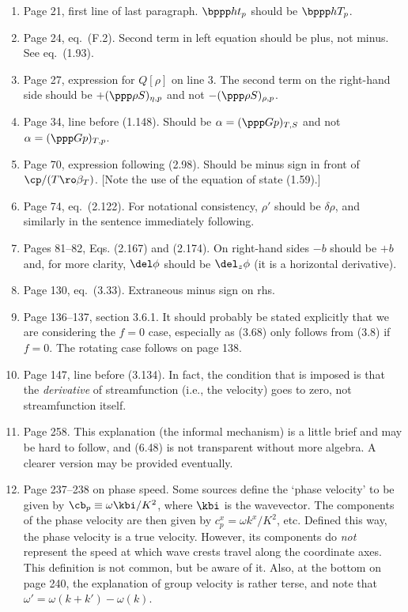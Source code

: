 \documentclass[10pt]{article}
\newcommand{\eq}{eq.\ } \newcommand{\Eq}{Eq.\ }
\begin{document}
\begin{enumerate}

\item Page 21, first line of last paragraph. $\bppp h t _p$ should be $\bppp hT_p$.

\item Page 24, \eq (F.2). Second term in left equation should be plus, not minus. See \eq (1.93).

\item Page 27, expression for $Q[\rho]$ on line 3. The second term on the right-hand side should be $+ (\ppp \rho S)_{\eta,p}$ and not $-(\ppp \rho S)_{\rho,p}$.

\item Page 34, line before (1.148). Should be $\alpha  = (\ppp G p)_{T,S}$ and not
$\alpha  = (\ppp G p)_{T,p}$.

\item Page 70, expression following (2.98). Should be minus sign in front of $\cp/(T 
\ro\beta_T)$. [Note the use of the equation of state (1.59).] 

\item Page 74, \eq (2.122). For notational consistency, $\rho'$ should be $\delta \rho$, and similarly in the sentence immediately following. 

\item Pages 81--82, Eqs. (2.167) and (2.174). On right-hand sides $-b$ should be $+b$ and, for more clarity, $\del \phi$ should be $\del_z\phi$ (it is a horizontal derivative).

\item Page 130, \eq (3.33). Extraneous minus sign on rhs.

\item Page 136--137, section 3.6.1. It should probably be stated explicitly that we are considering the $f=0$ case, especially as (3.68) only follows from (3.8) if $f=0$. The rotating case follows on page 138. 

\item Page 147, line before (3.134). In fact, the condition that is imposed is that the \emph{derivative} of streamfunction (i.e., the velocity) goes to zero, not streamfunction itself. 

\item \label{informal} Page 258. This explanation (the informal mechanism) is a little brief and may be hard to follow, and (6.48) is not transparent without more algebra. A clearer version may be provided eventually. 

\item Page 237--238 on phase speed. Some sources define the `phase velocity' to be given by $\cb_p \equiv \omega \kbi / K^2$, where $\kbi$ is the wavevector. The components of the phase velocity are then given by $c^x_p = \omega k^x/K^2$, etc. Defined this way, the phase velocity is a true velocity. However, its components do \emph{not} represent the speed at which wave crests travel along the coordinate axes. This definition is not common, but be aware of it. Also, at the bottom on page 240, the explanation of group velocity is rather terse, and note that ${\omega'} = \omega(k+k') - \omega(k)$.


\end{enumerate}
\end{document}
